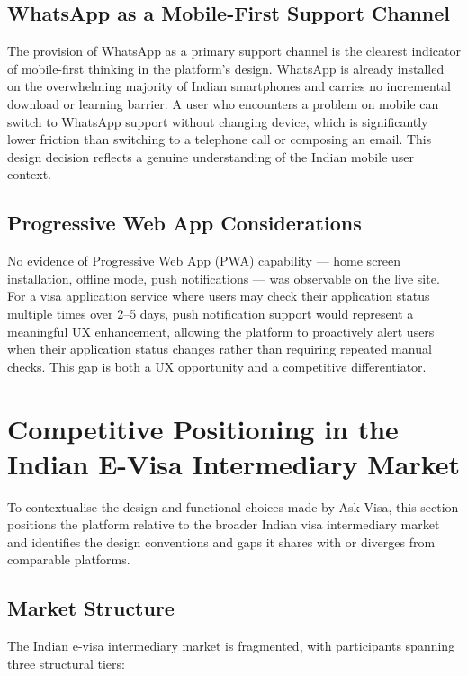\documentclass[journal, 10pt, twoside]{IEEEtran}
\begin{document}
\subsection{WhatsApp as a Mobile-First Support Channel}
The provision of WhatsApp as a primary support channel is the clearest
indicator of mobile-first thinking in the platform's design. WhatsApp is
already installed on the overwhelming majority of Indian smartphones and
carries no incremental download or learning barrier. A user who encounters
a problem on mobile can switch to WhatsApp support without changing device,
which is significantly lower friction than switching to a telephone call or
composing an email. This design decision reflects a genuine understanding
of the Indian mobile user context.

\subsection{Progressive Web App Considerations}
No evidence of Progressive Web App (PWA) capability --- home screen
installation, offline mode, push notifications --- was observable on the
live site. For a visa application service where users may check their
application status multiple times over 2--5 days, push notification support
would represent a meaningful UX enhancement, allowing the platform to
proactively alert users when their application status changes rather than
requiring repeated manual checks. This gap is both a UX opportunity and
a competitive differentiator.

\section{Competitive Positioning in the Indian E-Visa Intermediary Market}
\label{sec:competitive}

To contextualise the design and functional choices made by Ask Visa, this
section positions the platform relative to the broader Indian visa intermediary
market and identifies the design conventions and gaps it shares with or
diverges from comparable platforms.

\subsection{Market Structure}
The Indian e-visa intermediary market is fragmented, with participants
spanning three structural tiers:
\end{document}
